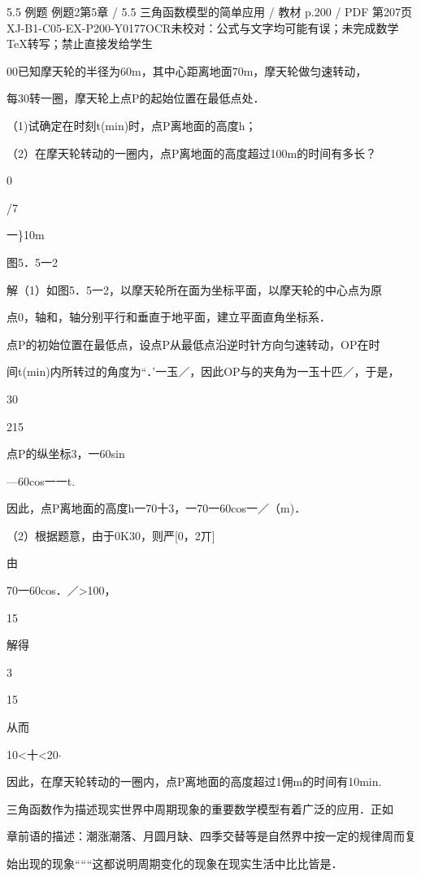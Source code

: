 \begin{bankitem}{5.5 例题 例题2}{第5章 / 5.5 三角函数模型的简单应用 / 教材 p.200 / PDF 第207页}{XJ-B1-C05-EX-P200-Y0177}{OCR未校对：公式与文字均可能有误；未完成数学TeX转写；禁止直接发给学生}
\begin{ocrdraft}
\par
00已知摩天轮的半径为60m，其中心距离地面70m，摩天轮做匀速转动，
\par
每30转一圈，摩天轮上点P的起始位置在最低点处．
\par
（1)试确定在时刻t(min)时，点P离地面的高度h；
\par
（2）在摩天轮转动的一圈内，点P离地面的高度超过100m的时间有多长？
\par
0
\par
/7
\par
一\}10m
\par
图5．5一2
\par
解（1）如图5．5一2，以摩天轮所在面为坐标平面，以摩天轮的中心点为原
\par
点0，轴和，轴分别平行和垂直于地平面，建立平面直角坐标系．
\par
点P的初始位置在最低点，设点P从最低点沿逆时针方向匀速转动，OP在时
\par
间t(min)内所转过的角度为“．'一玉／，因此OP与的夹角为一玉十匹／，于是，
\par
30
\par
215
\par
点P的纵坐标3，一60sin
\par
—60cos一一t.
\par
因此，点P离地面的高度h一70十3，一70一60cos一／（m)．
\par
（2）根据题意，由于0K30，则严[0，2丌]
\par
由
\par
70一60cos．／>100，
\par
15
\par
解得
\par
3
\par
15
\par
从而
\par
10<十<20\ensuremath{\cdot}
\par
因此，在摩天轮转动的一圈内，点P离地面的高度超过1佣m的时间有10min.
\par
三角函数作为描述现实世界中周期现象的重要数学模型有着广泛的应用．正如
\par
章前语的描述：潮涨潮落、月圆月缺、四季交替等是自然界中按一定的规律周而复
\par
始出现的现象“““这都说明周期变化的现象在现实生活中比比皆是．
\end{ocrdraft}
\end{bankitem}
